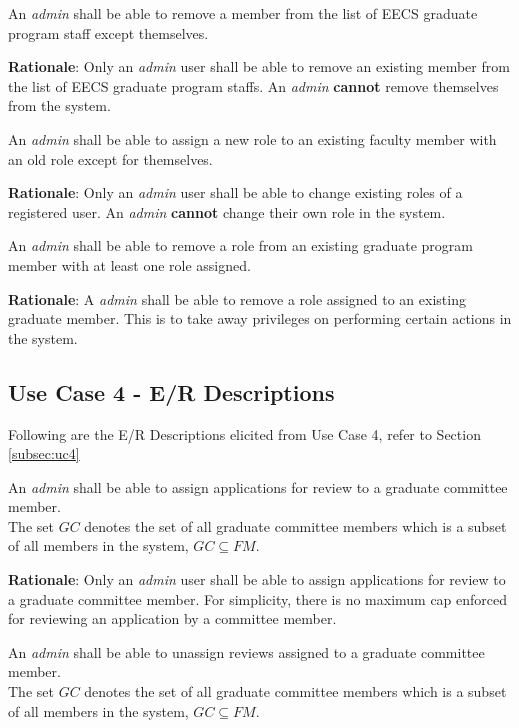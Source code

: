 \documentclass[fontsize=12pt,paper=letter,twoside]{scrartcl}
\begin{document}
\genreq
{An \emph{admin} shall be able to remove a member from the list of EECS graduate program staff except themselves.\\}
{}
\label{R9}

\smallskip
\noindent \textbf{Rationale}: Only an \emph{admin} user shall be able to remove an existing member from the list of EECS graduate program staffs. An \emph{admin} \textbf{cannot} remove themselves from the system.

\genreq
{An \emph{admin} shall be able to assign a new role to an existing faculty member with an old role except for themselves.\\}
{}
\label{R10}

\smallskip
\noindent \textbf{Rationale}: Only an \emph{admin} user shall be able to change existing roles of a registered user. An \emph{admin} \textbf{cannot} change their own role in the system.

\genreq
{An \emph{admin} shall be able to remove a role from an existing graduate program member with at least one role assigned.\\}
{}
\label{R11}

\smallskip
\noindent \textbf{Rationale}: A \emph{admin} shall be able to remove a role assigned to an existing graduate member. This is to take away privileges on performing certain actions in the system. 

\subsection{Use Case 4 - E/R Descriptions}

Following are the E/R Descriptions elicited from Use Case 4, refer to Section \ref{subsec:uc4}


\rdescription
{An \emph{admin} shall be able to assign applications for review to a graduate committee member.\\}
{The set $GC$ denotes the set of all graduate committee members which is a subset of all members in the system, $GC \subseteq FM$.}
\label{R12}

\smallskip
\noindent \textbf{Rationale}: Only an \emph{admin} user shall be able to assign applications for review to a graduate committee member. For simplicity, there is no maximum cap enforced for reviewing an application by a committee member.

\rdescription
{An \emph{admin} shall be able to unassign reviews assigned to a graduate committee member.\\}
{The set $GC$ denotes the set of all graduate committee members which is a subset of all members in the system, $GC \subseteq FM$.}
\end{document}
